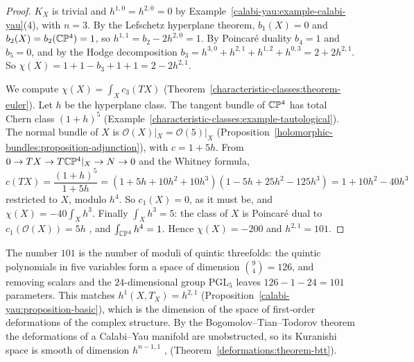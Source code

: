 \begin{proof}
$K_X$ is trivial and $h^{1,0} = h^{2,0} = 0$ by Example~\ref{calabi-yau:example-calabi-yau}(4), with $n = 3$. By the Lefschetz hyperplane theorem, $b_1(X) = 0$ and $b_2(X) = b_2(\mathbb{C}\mathbb{P}^4) = 1$,
so $h^{1,1} = b_2 - 2h^{2,0} = 1$. By Poincar\'e duality $b_4 = 1$ and $b_5 = 0$, and by the Hodge decomposition $b_3 = h^{3,0} + h^{2,1} + h^{1,2} + h^{0,3} = 2 + 2h^{2,1}$. So
$\chi(X) = 1 + 1 - b_3 + 1 + 1 = 2 - 2h^{2,1}$.

We compute $\chi(X) = \int_Xc_3(TX)$ (Theorem~\ref{characteristic-classes:theorem-euler}). Let $h$ be the hyperplane class. The tangent bundle of $\mathbb{C}\mathbb{P}^4$ has total Chern class $(1 + h)^5$
(Example~\ref{characteristic-classes:example-tautological}). The normal bundle of $X$ is $\mathcal{O}(X)|_X = \mathcal{O}(5)|_X$ (Proposition~\ref{holomorphic-bundles:proposition-adjunction}),
with $c = 1 + 5h$. From $0 \to TX \to T\mathbb{C}\mathbb{P}^4|_X \to N \to 0$ and the Whitney formula,
\[
c(TX) = \frac{(1 + h)^5}{1 + 5h} = (1 + 5h + 10h^2 + 10h^3)(1 - 5h + 25h^2 - 125h^3) = 1 + 10h^2 - 40h^3
\]
restricted to $X$, modulo $h^4$. So $c_1(X) = 0$, as it must be, and $\chi(X) = -40\int_Xh^3$. Finally $\int_Xh^3 = 5$: the class of $X$ is Poincar\'e dual to $c_1(\mathcal{O}(X)) = 5h$
\cite[Chapter 1, Section 1]{griffiths-harris}, and $\int_{\mathbb{C}\mathbb{P}^4}h^4 = 1$. Hence $\chi(X) = -200$ and $h^{2,1} = 101$.
\end{proof}

\begin{remark}\label{calabi-yau:remark-moduli-count}
The number $101$ is the number of moduli of quintic threefolds: the quintic polynomials in five variables form a space of dimension $\binom{9}{4} = 126$, and removing scalars and the
$24$-dimensional group $\mathrm{PGL}_5$ leaves $126 - 1 - 24 = 101$ parameters. This matches $h^1(X, T_X) = h^{2,1}$ (Proposition~\ref{calabi-yau:proposition-basic}), which is the
dimension of the space of first-order deformations of the complex structure. By the Bogomolov--Tian--Todorov theorem the deformations of a Calabi--Yau manifold are
unobstructed, so its Kuranishi space is smooth of dimension $h^{n-1,1}$ \cite{tian-1987}, \cite{todorov-1989}
(Theorem~\ref{deformations:theorem-btt}).
\end{remark}

